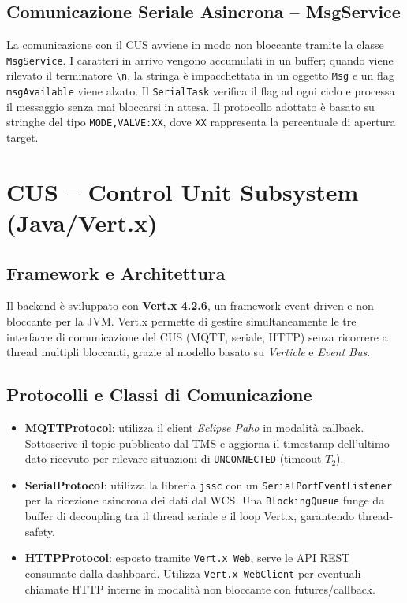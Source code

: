 \documentclass[12pt, a4paper]{article}
\begin{document}
\subsection{Comunicazione Seriale Asincrona -- MsgService}

La comunicazione con il CUS avviene in modo non bloccante tramite la classe \texttt{MsgService}. I caratteri in arrivo vengono accumulati in un buffer; quando viene rilevato il terminatore \texttt{\textbackslash n}, la stringa è impacchettata in un oggetto \texttt{Msg} e un flag \texttt{msgAvailable} viene alzato. Il \texttt{SerialTask} verifica il flag ad ogni ciclo e processa il messaggio senza mai bloccarsi in attesa. Il protocollo adottato è basato su stringhe del tipo \texttt{MODE,VALVE:XX}, dove \texttt{XX} rappresenta la percentuale di apertura target.

\section{CUS -- Control Unit Subsystem (Java/Vert.x)}

\subsection{Framework e Architettura}

Il backend è sviluppato con \textbf{Vert.x 4.2.6}, un framework event-driven e non bloccante per la JVM. Vert.x permette di gestire simultaneamente le tre interfacce di comunicazione del CUS (MQTT, seriale, HTTP) senza ricorrere a thread multipli bloccanti, grazie al modello basato su \textit{Verticle} e \textit{Event Bus}.

\subsection{Protocolli e Classi di Comunicazione}

\begin{itemize}
    \item \textbf{MQTTProtocol}: utilizza il client \textit{Eclipse Paho} in modalità callback. Sottoscrive il topic pubblicato dal TMS e aggiorna il timestamp dell'ultimo dato ricevuto per rilevare situazioni di \texttt{UNCONNECTED} (timeout $T_2$).

    \item \textbf{SerialProtocol}: utilizza la libreria \texttt{jssc} con un \texttt{SerialPortEventListener} per la ricezione asincrona dei dati dal WCS. Una \texttt{BlockingQueue} funge da buffer di decoupling tra il thread seriale e il loop Vert.x, garantendo thread-safety.

    \item \textbf{HTTPProtocol}: esposto tramite \texttt{Vert.x Web}, serve le API REST consumate dalla dashboard. Utilizza \texttt{Vert.x WebClient} per eventuali chiamate HTTP interne in modalità non bloccante con futures/callback.
\end{itemize}
\end{document}
